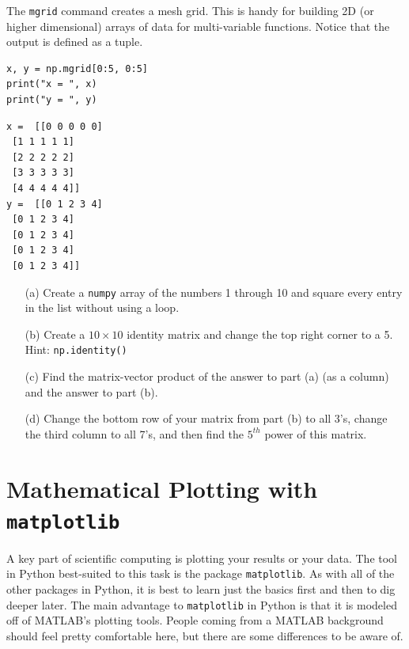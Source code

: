 \begin{example}[Mgrid]
    The \texttt{mgrid} command creates a mesh grid.  This is handy for building 2D (or
    higher dimensional) arrays of data for multi-variable functions.  Notice that the
    output is defined as a tuple.

\bcode
\begin{lstlisting}
x, y = np.mgrid[0:5, 0:5]
print("x = ", x)
print("y = ", y)
\end{lstlisting}
\boutput
\begin{lstlisting}
x =  [[0 0 0 0 0]
 [1 1 1 1 1]
 [2 2 2 2 2]
 [3 3 3 3 3]
 [4 4 4 4 4]]
y =  [[0 1 2 3 4]
 [0 1 2 3 4]
 [0 1 2 3 4]
 [0 1 2 3 4]
 [0 1 2 3 4]]
\end{lstlisting}
\end{example}

\begin{problem}
    \begin{enumerate}
        \item[(a)] Create a \texttt{numpy} array of the numbers 1 through 10 and square every entry in the list without using a loop.
        \item[(b)] Create a $10 \times 10$ identity matrix and change the top right corner
            to a 5.  Hint: \texttt{np.identity()}
        \item[(c)] Find the matrix-vector product of the answer to part (a) (as a column) and the answer to part (b).
        \item[(d)] Change the bottom row of your matrix from part (b) to all 3's, change the third column to all 7's, and then find the $5^{th}$ power of this matrix.
    \end{enumerate}
\end{problem}


\section{Mathematical Plotting with \texttt{matplotlib}}
A key part of scientific computing is plotting your results or your data.  The tool in
Python best-suited to this task is the package \texttt{matplotlib}.  As with all of the
other packages in Python, it is best to learn just the basics first and then to dig deeper
later.  The main advantage to \texttt{matplotlib} in Python is that it is modeled off of
MATLAB's plotting tools.  People coming from a MATLAB background should feel pretty
comfortable here, but there are some differences to be aware of.

